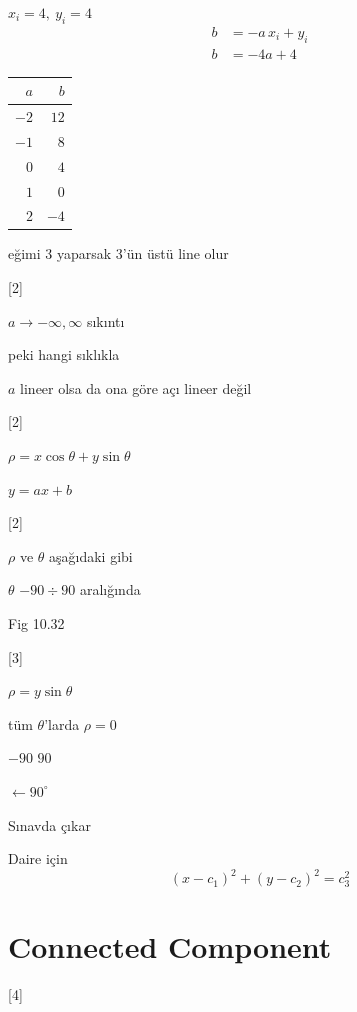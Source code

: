 \documentclass[11pt,a4paper]{article}
\begin{document}
{\color{morkalem}
$x_i=4,\ y_i=4$
\begin{align*}
b&=-a\,x_i+y_i\\
b&=-4a+4
\end{align*}
\begin{tabular}{r|r}
$a$ & $b$\\\hline
$-2$ & $12$\\
$-1$ & $8$\\
$0$ & $4$\\
$1$ & $0$\\
$2$ & $-4$
\end{tabular}}

eğimi 3 yaparsak 3'ün üstü line olur

[2]

$a\to-\infty,\infty$ sıkıntı

peki hangi sıklıkla

$a$ lineer olsa da ona göre açı lineer değil

[2]

{\color{turuncukalem}$\rho=x\cos\theta+y\sin\theta$}

$y=ax+b$

[2]

$\rho$ ve $\theta$ aşağıdaki gibi

$\theta$ $-90\div 90$ aralığında

Fig 10.32

[3]


{\color{kirmizikalem}$\rho=y\sin\theta$}

tüm $\theta$'larda $\rho=0$

$-90$ \qquad $90$

$\leftarrow 90^\circ$

\begin{dikkat}
Sınavda çıkar
\end{dikkat}

Daire için
\[ (x-c_1)^2+(y-c_2)^2=c_3^2 \]

\section{Connected Component}
[4]
\end{document}
